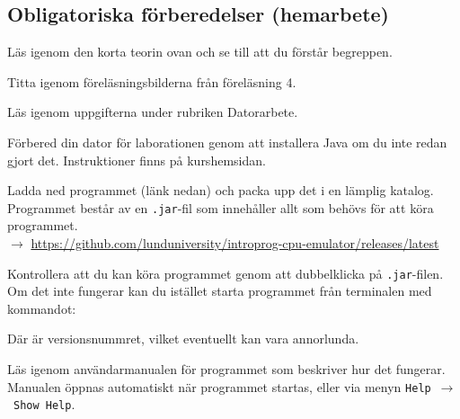 \subsection*{Obligatoriska förberedelser (hemarbete)}
\begin{Hemarbete}\firmlist
    \item Läs igenom den korta teorin ovan och se till att du förstår begreppen.
    \item Titta igenom föreläsningsbilderna från föreläsning 4.
    \item Läs igenom uppgifterna under rubriken Datorarbete.
    \item Förbered din dator för laborationen genom att installera Java om du inte redan gjort det. Instruktioner finns på kurshemsidan.
    \item Ladda ned programmet \textbf{\progname} (länk nedan) och packa upp det i en lämplig katalog. Programmet består av en \texttt{.jar}-fil som innehåller allt som behövs för att köra programmet.\\
    $\rightarrow$ \url{https://github.com/lunduniversity/introprog-cpu-emulator/releases/latest}
    \item Kontrollera att du kan köra programmet genom att dubbelklicka på \texttt{.jar}-filen. Om det inte fungerar kan du istället starta programmet från terminalen med kommandot:
    \begin{center}
        {}
    \end{center}
    Där \code{\progversion} är versionsnummret, vilket eventuellt kan vara annorlunda.
    \item Läs igenom användarmanualen för programmet som beskriver hur det fungerar. Manualen öppnas automatiskt när programmet startas, eller via menyn \texttt{Help}~$\rightarrow$~\texttt{Show Help}.
\end{Hemarbete}

